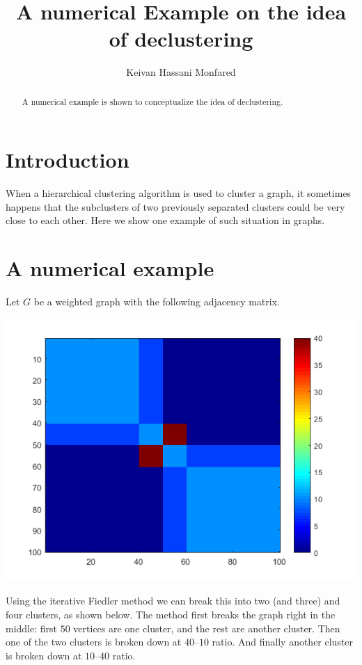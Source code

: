 \documentclass[]{amsart}
\title{A numerical Example on the idea of declustering}
\author{Keivan Hassani Monfared}
\begin{document}
\maketitle

\begin{abstract}
	A numerical example is shown to conceptualize the idea of declustering.
\end{abstract}

\section{Introduction}
	When a hierarchical clustering algorithm is used to cluster a graph, it sometimes happens that the subclusters of two previously separated clusters could be very close to each other. Here we show one example of such situation in graphs.
	
\section{A numerical example}
	Let $G$ be a weighted graph with the following adjacency matrix.
	
	\begin{center}
		\includegraphics[width = .8\linewidth]{sample_graph}
	\end{center}
	
	Using the iterative Fiedler method we can break this into two (and three) and four clusters, as shown below. The method first breaks the graph right in the middle: first $50$ vertices are one cluster, and the rest are another cluster. Then one of the two clusters is broken down at $40$--$10$ ratio. And finally another cluster is broken down at $10$--$40$ ratio.
  	
\end{document}
